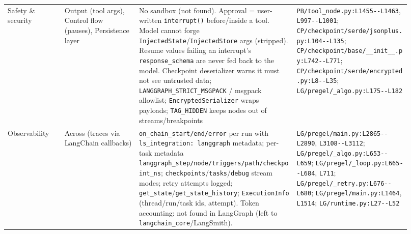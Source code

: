 \begin{longtable}{@{}p{0.13\linewidth}p{0.17\linewidth}p{0.36\linewidth}p{0.26\linewidth}@{}}
Safety \& security & Output (tool args), Control flow (pauses), Persistence layer & No sandbox (not found). Approval = user-written \texttt{interrupt(\allowbreak{})} before/inside a tool. Model cannot forge \texttt{InjectedState}/\texttt{InjectedStore} args (stripped). Resume values failing an interrupt's \texttt{response\_\allowbreak{}schema} are never fed back to the model. Checkpoint deserializer warns it must not see untrusted data; \texttt{LANGGRAPH\_\allowbreak{}STRICT\_\allowbreak{}MSGPACK} / msgpack allowlist; \texttt{EncryptedSerializer} wraps payloads; \texttt{TAG\_\allowbreak{}HIDDEN} keeps nodes out of streams/breakpoints & \texttt{PB/\allowbreak{}tool\_\allowbreak{}node.\allowbreak{}py:\allowbreak{}L1455-\allowbreak{}-\allowbreak{}L1463}, \texttt{L997-\allowbreak{}-\allowbreak{}L1001}; \texttt{CP/\allowbreak{}checkpoint/\allowbreak{}serde/\allowbreak{}jsonplus.\allowbreak{}py:\allowbreak{}L104-\allowbreak{}-\allowbreak{}L135}; \texttt{CP/\allowbreak{}checkpoint/\allowbreak{}base/\allowbreak{}\_\allowbreak{}\_\allowbreak{}init\_\allowbreak{}\_\allowbreak{}.\allowbreak{}py:\allowbreak{}L742-\allowbreak{}-\allowbreak{}L771}; \texttt{CP/\allowbreak{}checkpoint/\allowbreak{}serde/\allowbreak{}encrypted.\allowbreak{}py:\allowbreak{}L8-\allowbreak{}-\allowbreak{}L35}; \texttt{LG/\allowbreak{}pregel/\allowbreak{}\_\allowbreak{}algo.\allowbreak{}py:\allowbreak{}L175-\allowbreak{}-\allowbreak{}L182} \\
Observability & Across (traces via LangChain callbacks) & \texttt{on\_\allowbreak{}chain\_\allowbreak{}start/\allowbreak{}end/\allowbreak{}error} per run with \texttt{ls\_\allowbreak{}integration:\allowbreak{} langgraph} metadata; per-task metadata \texttt{langgraph\_\allowbreak{}step/\allowbreak{}node/\allowbreak{}triggers/\allowbreak{}path/\allowbreak{}checkpoint\_\allowbreak{}ns}; \texttt{checkpoints}/\texttt{tasks}/\texttt{debug} stream modes; retry attempts logged; \texttt{get\_\allowbreak{}state}/\texttt{get\_\allowbreak{}state\_\allowbreak{}history}; \texttt{ExecutionInfo} (thread/run/task ids, attempt). Token accounting: not found in LangGraph (left to \texttt{langchain\_\allowbreak{}core}/LangSmith). & \texttt{LG/\allowbreak{}pregel/\allowbreak{}main.\allowbreak{}py:\allowbreak{}L2865-\allowbreak{}-\allowbreak{}L2890}, \texttt{L3108-\allowbreak{}-\allowbreak{}L3112}; \texttt{LG/\allowbreak{}pregel/\allowbreak{}\_\allowbreak{}algo.\allowbreak{}py:\allowbreak{}L653-\allowbreak{}-\allowbreak{}L659}; \texttt{LG/\allowbreak{}pregel/\allowbreak{}\_\allowbreak{}loop.\allowbreak{}py:\allowbreak{}L665-\allowbreak{}-\allowbreak{}L684}, \texttt{L711}; \texttt{LG/\allowbreak{}pregel/\allowbreak{}\_\allowbreak{}retry.\allowbreak{}py:\allowbreak{}L676-\allowbreak{}-\allowbreak{}L680}; \texttt{LG/\allowbreak{}pregel/\allowbreak{}main.\allowbreak{}py:\allowbreak{}L1464}, \texttt{L1514}; \texttt{LG/\allowbreak{}runtime.\allowbreak{}py:\allowbreak{}L27-\allowbreak{}-\allowbreak{}L52} \\

\end{longtable}
